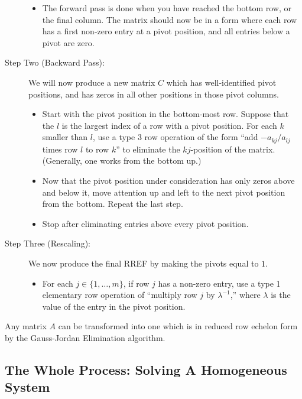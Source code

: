 \documentclass[elementsmain.tex]{subfiles}
\begin{document}
\begin{description}
\begin{itemize}
\item The forward pass is done when you have reached the bottom row, or the final column. The matrix should now be in a form where each row has a first non-zero entry at a pivot position, and all entries below a pivot are zero.
\end{itemize}

\item[Step Two (Backward Pass):] We will now produce a new matrix $C$ which has well-identified pivot positions, and has zeros in all other positions in those pivot columns.
\begin{itemize}
\item Start with the pivot position in the bottom-most row. Suppose that the $l$ is the largest index of a row with a pivot position. For each $k$ smaller than $l$, use a type 3 row operation of the form ``add $-a_{kj}/a_{lj}$ times row $l$ to row $k$'' to eliminate the $kj$-position of the matrix. (Generally, one works from the bottom up.)
\item Now that the pivot position under consideration has only zeros above and below it, move attention up and left to the next pivot position from the bottom. Repeat the last step.
\item Stop after eliminating entries above every pivot position.
\end{itemize}

\item[Step Three (Rescaling):] We now produce the final RREF by making the pivots equal to $1$. 
\begin{itemize}
\item For each $j \in \{1,\dots, m\}$, if row $j$ has a non-zero entry, use a type 1 elementary row operation of ``multiply row $j$ by $\lambda^{-1}$,'' where $\lambda$ is the value of the entry in the pivot position.
\end{itemize}

\end{description}


\begin{theorem}[RREF]
Any matrix $A$ can be transformed into one which is in reduced row echelon form by the Gauss-Jordan Elimination algorithm.
\end{theorem}


\subsection*{The Whole Process: Solving A Homogeneous System}
\end{document}

